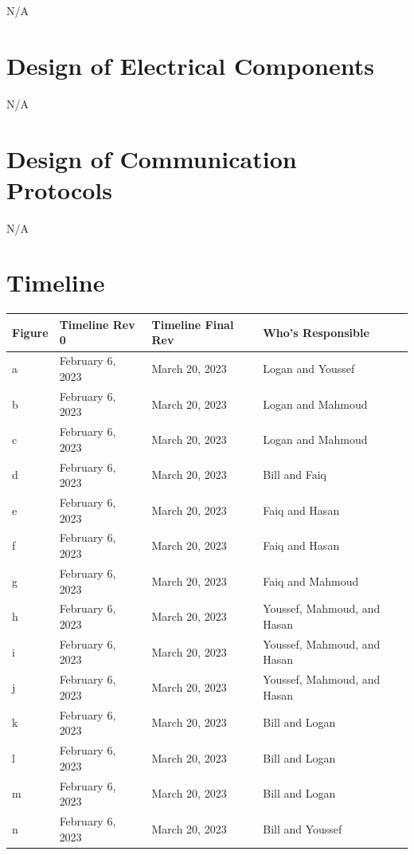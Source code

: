 \documentclass[12pt, titlepage]{article}
\begin{document}
N/A

\section{Design of Electrical Components}

N/A

\section{Design of Communication Protocols}

N/A

\section{Timeline}

\begin{table}[H]
	\begin{tabular}{|l|l|l|l|}
		\hline
		Figure & Timeline Rev 0   & Timeline Final Rev & Who's Responsible           \\ \hline
		a      & February 6, 2023 & March 20, 2023     & Logan and Youssef           \\ \hline
		b      & February 6, 2023 & March 20, 2023     & Logan and Mahmoud           \\ \hline
		c      & February 6, 2023 & March 20, 2023     & Logan and Mahmoud           \\ \hline
		d      & February 6, 2023 & March 20, 2023     & Bill and Faiq               \\ \hline
		e      & February 6, 2023 & March 20, 2023     & Faiq and Hasan              \\ \hline
		f      & February 6, 2023 & March 20, 2023     & Faiq and Hasan              \\ \hline
		g      & February 6, 2023 & March 20, 2023     & Faiq and Mahmoud            \\ \hline
		h      & February 6, 2023 & March 20, 2023     & Youssef, Mahmoud, and Hasan \\ \hline
		i      & February 6, 2023 & March 20, 2023     & Youssef, Mahmoud, and Hasan \\ \hline
		j      & February 6, 2023 & March 20, 2023     & Youssef, Mahmoud, and Hasan \\ \hline
		k      & February 6, 2023 & March 20, 2023     & Bill and Logan              \\ \hline
		l      & February 6, 2023 & March 20, 2023     & Bill and Logan              \\ \hline
		m      & February 6, 2023 & March 20, 2023     & Bill and Logan              \\ \hline
		n      & February 6, 2023 & March 20, 2023     & Bill and Youssef            \\ \hline
	\end{tabular}
\end{table}
\end{document}
